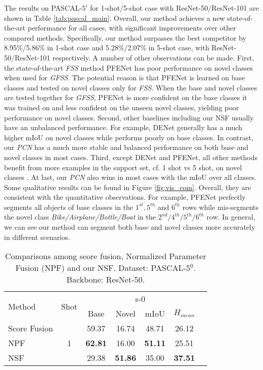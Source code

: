 \documentclass[journal]{IEEEtran}
\begin{document}
The results on PASCAL-$5^{i}$ for 1-shot/5-shot case with ResNet-50/ResNet-101 are shown in Table \ref{tab:pascal_main}.
Overall, our method achieves a new state-of-the-art performance for all cases, with significant improvements over other compared methods.
Specifically, our method surpasses the best competitor by 8.95\%/5.86\% in 1-shot case and 5.28\%/2.07\% in 5-shot case, with ResNet-50/ResNet-101 respectively.
A number of other observations can be made.
First, the state-of-the-art \textit{FSS} method PFENet \cite{tian2020prior} has poor performance on novel classes when used for \textit{GFSS}.
The potential reason is that PFENet is learned on base classes and tested on novel classes only for \textit{FSS}. 
When the base and novel classes are tested together for \textit{GFSS}, PFENet is more confident on the base classes it was trained on and less confident on the unseen novel classes, yielding poor performance on novel classes. 
Second, other baselines including our NSF usually have an unbalanced performance. 
For example, DENet \cite{liu2020dynamic} generally has a much higher mIoU on novel classes while performs poorly on base classes. 
In contrast, our \textit{PCN} has a much more stable and balanced performance on both base and novel classes in most cases.
Third, except DENet and PFENet, all other methods benefit from more examples in the support set, cf. 1 shot vs 5 shot, on novel classes .
At last, our \textit{PCN} also wins in most cases with the mIoU over all classes.
Some qualitative results can be found in Figure \ref{fig:vis_com}. Overall, they are consistent with the quantitative observations.
For example, PFENet perfectly segments all objects of base classes in the $1^{st}, 5^{th}$ and $6^{th}$ rows while mis-segments the novel class \textit{Bike/Airplane/Bottle/Boat} in the $2^{nd}/4^{th}/5^{th}/6^{th}$ row.
In general, we can see our method can segment both base and novel classes more accurately in different scenarios.

\begin{table}[ht]
    \centering
    \caption{Comparisons among score fusion, Normalized Parameter Fusion (NPF) and our NSF. Dataset: PASCAL-5$^{0}$. Backbone: ResNet-50.}
\begin{tabular}{l|c|ccccc}
    \hline
         \multirow{2}{*}{Method} & \multirow{2}{*}{Shot} & \multicolumn{4}{c}{s-0} \\
         \cline{3-6}
          & & Base & Novel & mIoU & $H_{mean}$ \\
         \hline
         Score Fusion &\multirow{3}{*}{1}  & 59.37 & 16.74 & 48.71 & 26.12 \\
NPF & & \textbf{62.81} & 16.00 & \textbf{51.11} & 25.51 \\
         NSF & & 29.38 & \textbf{51.86} & 35.00 & \textbf{37.51} \\
    \hline
    \end{tabular}
\label{tab:score_fusion}
\end{table}
\end{document}
